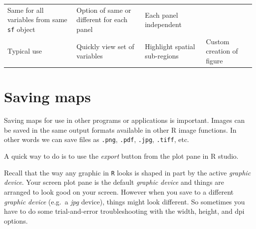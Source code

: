 \documentclass[
]{book}
\newcommand{\passthrough}[1]{#1}
\begin{document}
\begin{longtable}[]{@{}llll@{}}
\begin{minipage}[t]{0.31\columnwidth}
Same for all variables from same \passthrough{\lstinline!sf!} object\strut
\end{minipage} & \begin{minipage}[t]{0.20\columnwidth}\raggedright
Option of same or different for each panel\strut
\end{minipage} & \begin{minipage}[t]{0.24\columnwidth}\raggedright
Each panel independent\strut
\end{minipage}\tabularnewline
\begin{minipage}[t]{0.14\columnwidth}\raggedright
Typical use\strut
\end{minipage} & \begin{minipage}[t]{0.31\columnwidth}\raggedright
Quickly view set of variables\strut
\end{minipage} & \begin{minipage}[t]{0.20\columnwidth}\raggedright
Highlight spatial sub-regions\strut
\end{minipage} & \begin{minipage}[t]{0.24\columnwidth}\raggedright
Custom creation of figure\strut
\end{minipage}\tabularnewline
\bottomrule
\end{longtable}

\hypertarget{saving-maps}{%
\section{Saving maps}\label{saving-maps}}

Saving maps for use in other programs or applications is important. Images can be saved in the same output formats available in other R image functions. In other words we can save files as \passthrough{\lstinline!.png!}, \passthrough{\lstinline!.pdf!}, \passthrough{\lstinline!.jpg!}, \passthrough{\lstinline!.tiff!}, etc.

A quick way to do is to use the \emph{export} button from the plot pane in R studio.

Recall that the way any graphic in \passthrough{\lstinline!R!} looks is shaped in part by the active \emph{graphic device}. Your screen plot pane is the default \emph{graphic device} and things are arranged to look good on your screen. However when you save to a different \emph{graphic device} (e.g.~a \emph{jpg} device), things might look different. So sometimes you have to do some trial-and-error troubleshooting with the width, height, and dpi options.
\end{document}
